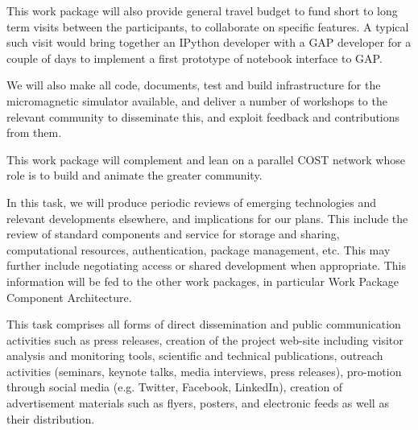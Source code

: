 \begin{workpackage}
\begin{wpdescription}
  This work package will also provide general travel budget to fund
  short to long term visits between the participants, to collaborate
  on specific features. A typical such visit would bring together an
  IPython developer with a GAP developer for a couple of days to
  implement a first prototype of notebook interface to GAP.

  We will also make all code, documents, test and build infrastructure
  for the micromagnetic simulator available, and deliver a number of
  workshops to the relevant community to disseminate this, and exploit
  feedback and contributions from them.

  This work package will complement and lean on a parallel COST
  network whose role is to build and animate the greater community.
\end{wpdescription}

\begin{tasklist}
\begin{task}[title=Reviewing emerging technologies, id=tech-review]
  In this task, we will produce periodic reviews of emerging
  technologies and relevant developments elsewhere, and implications
  for our plans. This include the review of standard components and
  service for storage and sharing, computational resources,
  authentication, package management, etc. This may further include
  negotiating access or shared development when appropriate. This
  information will be fed to the other work packages, in particular
  Work Package~ Component Architecture.
\end{task}

\begin{task}[title=Dissemination and Communication activities, id=dissemination-communication]


  This task comprises all forms of direct dissemination and public
  communication activities such as press releases, creation of the
  project web-site including visitor analysis and monitoring tools,
  scientific and technical publications, outreach activities
  (seminars, keynote talks, media interviews, press releases),
  pro-motion through social media (e.g. Twitter, Facebook, LinkedIn),
  creation of advertisement materials such as flyers, posters, and
  electronic feeds as well as their distribution.



\end{task}
\end{tasklist}
\end{workpackage}
